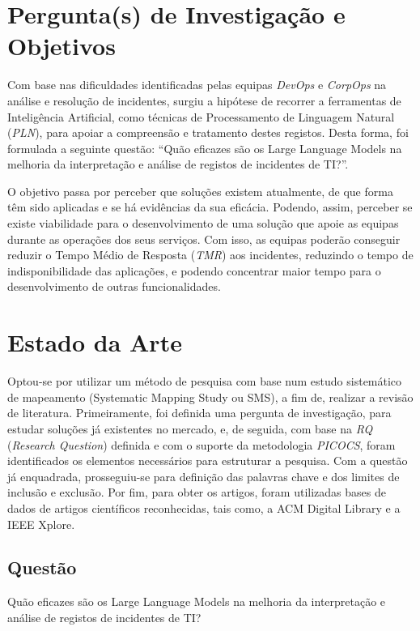 \section{Pergunta(s) de Investigação e Objetivos}
	Com base nas dificuldades identificadas pelas equipas \textit{DevOps} e \textit{CorpOps} na análise e resolução de incidentes, surgiu a hipótese de recorrer a ferramentas de Inteligência Artificial, como técnicas de Processamento de Linguagem Natural (\textit{PLN}), para apoiar a compreensão e tratamento destes registos. Desta forma, foi formulada a seguinte questão: “Quão eficazes são os Large Language Models na melhoria da interpretação e análise de registos de incidentes de TI?”.
	
	O objetivo passa por perceber que soluções existem atualmente, de que forma têm sido aplicadas e se há evidências da sua eficácia. Podendo, assim, perceber se existe viabilidade para o desenvolvimento de uma solução que apoie as equipas durante as operações dos seus serviços. Com isso, as equipas poderão conseguir reduzir o Tempo Médio de Resposta (\textit{TMR}) aos incidentes, reduzindo o tempo de indisponibilidade das aplicações, e podendo concentrar maior tempo para o desenvolvimento de outras funcionalidades.

\section{Estado da Arte}
	Optou-se por utilizar um método de pesquisa com base num estudo sistemático de mapeamento (Systematic Mapping Study ou SMS), a fim de, realizar a revisão de literatura. Primeiramente, foi definida uma pergunta de investigação, para estudar soluções já existentes no mercado, e, de seguida, com base na \textit{RQ} (\textit{Research Question}) definida e com o suporte da metodologia \textit{PICOCS}, foram identificados os elementos necessários para estruturar a pesquisa. Com a questão já enquadrada, prosseguiu-se para definição das palavras chave e dos limites de inclusão e exclusão. Por fim, para obter os artigos, foram utilizadas bases de dados de artigos científicos reconhecidas, tais como, a ACM Digital Library e a IEEE Xplore.

	\subsection{Questão}
		Quão eficazes são os Large Language Models na melhoria da interpretação e análise de registos de incidentes de TI?
	
